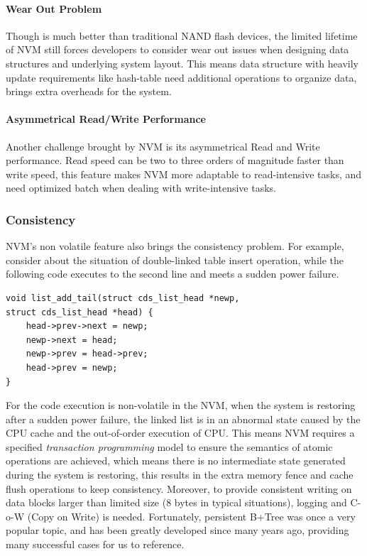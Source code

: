 \paragraph{Wear Out Problem}
Though is much better than traditional NAND flash devices, the limited lifetime of NVM still forces developers to consider wear out issues when designing data structures and underlying system layout\cite{dulloor2014system,van2018managing}. This means data structure with heavily update requirements like hash-table need additional operations to organize data, brings extra overheads for the system. 

\paragraph{Asymmetrical Read/Write Performance}
Another challenge brought by NVM is its asymmetrical Read and Write performance\cite{wu2017early}. Read speed can be two to three orders of magnitude faster than write speed, this feature makes NVM more adaptable to read-intensive tasks, and need optimized batch when dealing with write-intensive tasks.

\subsubsection{Consistency}

NVM's non volatile feature also brings the consistency problem. For example, consider about the situation of double-linked table insert operation, while the following code executes to the second line and meets a sudden power failure.
\begin{verbatim}
void list_add_tail(struct cds_list_head *newp,
struct cds_list_head *head) {
	head->prev->next = newp;
	newp->next = head;
	newp->prev = head->prev;
	head->prev = newp;
}
\end{verbatim}
For the code execution is non-volatile in the NVM, when the system is restoring after a sudden power failure, the linked list is in an abnormal state caused by the CPU cache and the out-of-order execution of CPU. This means NVM requires a specified \textit{transaction programming} model\cite{volos2011mnemosyne,dulloor2014system,ren2015thynvm,188438} to ensure the semantics of atomic operations are achieved, which means there is no intermediate state generated during the system is restoring, this results in the extra memory fence and cache flush operations to keep consistency. Moreover, to provide consistent writing on data blocks larger than limited size (8 bytes in typical situations), logging and C-o-W (Copy on Write) is needed. Fortunately, persistent B+Tree\cite{188438,oukid2016fptree} was once a very popular topic, and has been greatly developed since many years ago, providing many successful cases for us to reference.

